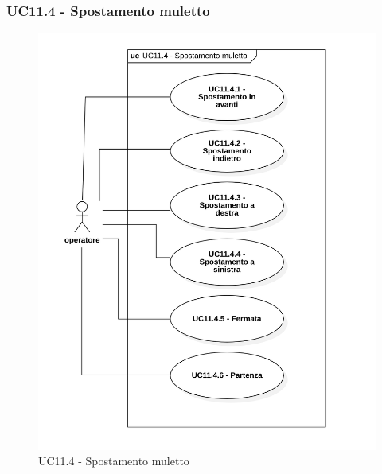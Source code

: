 \subsubsection{UC11.4 - Spostamento muletto}

\begin{figure}[H]
	\centering
	\includegraphics[scale=0.52]{res/images/uc11-4.png}
	\caption{UC11.4 - Spostamento muletto}
\end{figure}

